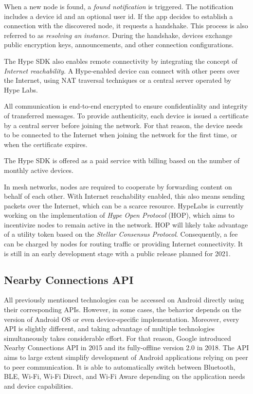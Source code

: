 \documentclass[conference,compsoc]{IEEEtran}
\begin{document}
When a new node is found, a \textit{found notification} is triggered. The notification includes a device id and an optional user id. If the app decides to establish a connection with the discovered node, it requests a handshake. This process is also referred to as \textit{resolving an instance}. During the handshake, devices exchange public encryption keys, announcements, and other connection configurations.

The Hype SDK also enables remote connectivity by integrating the concept of \textit{Internet reachability}. A Hype-enabled device can connect with other peers over the Internet, using NAT traversal techniques or a central server operated by Hype Labs.

All communication is end-to-end encrypted to ensure confidentiality and integrity of transferred messages. To provide authenticity, each device is issued a certificate by a central server before joining the network. For that reason, the device needs to be connected to the Internet when joining the network for the first time, or when the certificate expires.

The Hype SDK is offered as a paid service with billing based on the number of monthly active devices.

In mesh networks, nodes are required to cooperate by forwarding content on behalf of each other. With Internet reachability enabled, this also means sending packets over the Internet, which can be a scarce resource. HypeLabs is currently working on the implementation of \textit{Hype Open Protocol} (HOP), which aims to incentivize nodes to remain active in the network. HOP will likely take advantage of a utility token based on the \textit{Stellar Consensus Protocol}. Consequently, a fee can be charged by nodes for routing traffic or providing Internet connectivity. It is still in an early development stage with a public release planned for 2021. \cite{hop}


\subsection{Nearby Connections API}

All previously mentioned technologies can be accessed on Android directly using their corresponding APIs. However, in some cases, the behavior depends on the version of Android OS or even device-specific implementation. Moreover, every API is slightly different, and taking advantage of multiple technologies simultaneously takes considerable effort. For that reason, Google introduced Nearby Connections API in 2015 and its fully-offline version 2.0 in 2018. \cite{nearby2} The API aims to large extent simplify development of Android applications relying on peer to peer communication. It is able to automatically switch between Bluetooth, BLE, Wi-Fi, Wi-Fi Direct, and Wi-Fi Aware depending on the application needs and device capabilities.
\end{document}
